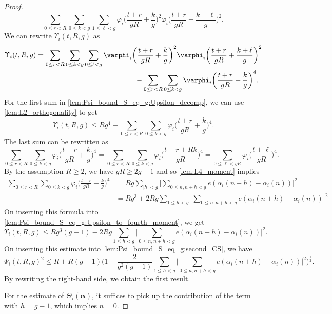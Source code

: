 \documentclass[hidelinks]{amsart}
\numberwithin{equation}{section}
\theoremstyle{plain}
\theoremstyle{definition}
\let\tmp\phi
\let\phi\varphi
\let\varphi\tmp
\let\tmp\epsilon
\let\epsilon\varepsilon
\let\varepsilon\tmp
\begin{document}
\begin{proof}
\[\sum_{0\le r<R}
\sum_{0\le k<g}
\sum_{1\le\ell<g}
\phi_{i}\biggl(\frac{t+r}{gR}+\frac{k}{g}\biggr)^{2}
\phi_{i}\biggl(\frac{t+r}{gR}+\frac{k+\ell}{g}\biggr)^{2}.
\]
We can rewrite $\Upsilon_{i}(t,R,g)$ as
\begin{equation}
\label{lem:Psi_bound_S_eq_g:Upsilon_decomp}
\begin{aligned}
\Upsilon_{i}(t,R,g)
&=
\sum_{0\le r<R}
\sum_{0\le k<g}
\sum_{0\le\ell<g}
\phi_{i}\biggl(\frac{t+r}{gR}+\frac{k}{g}\biggr)^{2}
\phi_{i}\biggl(\frac{t+r}{gR}+\frac{k+\ell}{g}\biggr)^{2}\\
&\hspace{0.4\textwidth}-
\sum_{0\le r<R}
\sum_{0\le k<g}
\phi_{i}\biggl(\frac{t+r}{gR}+\frac{k}{g}\biggr)^{4}.
\end{aligned}
\end{equation}
For the first sum in \cref{lem:Psi_bound_S_eq_g:Upsilon_decomp},
we can use \cref{lem:L2_orthogonality} to get
\begin{equation}
\label{lem:Psi_bound_S_eq_g:Upsilon_to_fourth_moment}
\Upsilon_{i}(t,R,g)
\le
Rg^{4}
-
\sum_{0\le r<R}
\sum_{0\le k<g}
\phi_{i}\biggl(\frac{t+r}{gR}+\frac{k}{g}\biggr)^{4}.
\end{equation}
The last sum can be rewritten as
\[
\sum_{0\le r<R}
\sum_{0\le k<g}
\phi_{i}\biggl(\frac{t+r}{gR}+\frac{k}{g}\biggr)^{4}
=
\sum_{0\le r<R}
\sum_{0\le k<g}
\phi_{i}\biggl(\frac{t+r+Rk}{gR}\biggr)^{4}
=
\sum_{0\le\ell<gR}
\phi_{i}\biggl(\frac{t+\ell}{gR}\biggr)^{4}.
\]
By the assumption $R\ge2$, we have $gR\ge2g-1$ and so \cref{lem:L4_moment} implies
\begin{align}
\sum_{0\le r<R}
\sum_{0\le k<g}
\phi_{i}\biggl(\frac{t+r}{gR}+\frac{k}{g}\biggr)^{4}
&=
Rg
\sum_{|h|<g}
\biggl|
\sum_{0\le n,n+h<g}
e(\alpha_{i}(n+h)-\alpha_{i}(n))
\biggr|^{2}\\
&=
Rg^{3}
+
2Rg\sum_{1\le h<g}
\biggl|
\sum_{0\le n,n+h<g}
e(\alpha_{i}(n+h)-\alpha_{i}(n))
\biggr|^{2}
\end{align}
On inserting this formula into \cref{lem:Psi_bound_S_eq_g:Upsilon_to_fourth_moment}, we get
\[
\Upsilon_{i}(t,R,g)
\le
Rg^{3}(g-1)
-2Rg\sum_{1\le h<g}
\biggl|
\sum_{0\le n,n+h<g}
e(\alpha_{i}(n+h)-\alpha_{i}(n))
\biggr|^{2}.
\]
On inserting this estimate into \cref{lem:Psi_bound_S_eq_g:second_CS}, we have
\[
\Psi_{i}(t,R,g)^{2}
\le
R
+
R(g-1)
\biggl(
1
-
\frac{2}{g^{2}(g-1)}\sum_{1\le h<g}
\biggl|
\sum_{0\le n,n+h<g}
e(\alpha_{i}(n+h)-\alpha_{i}(n))
\biggr|^{2}
\biggr)^{\frac{1}{2}}.
\]
By rewriting the right-hand side, we obtain the first result.

For the estimate of $\Theta_{i}(\bm{\alpha})$,
it suffices to pick up the contribution of the term with $h=g-1$,
which implies $n=0$.
\end{proof}
\end{document}
